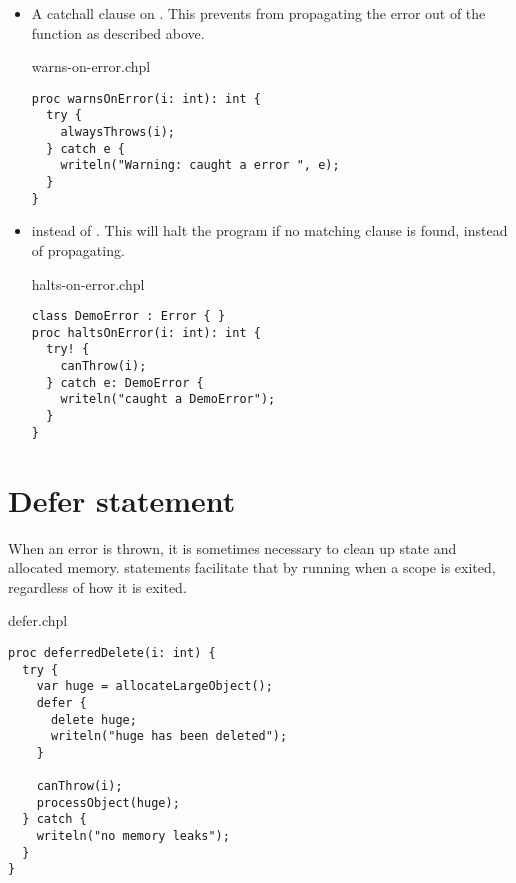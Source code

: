 \begin{itemize}

\item A catchall clause on . This prevents  from
propagating the error out of the function as described above.

\begin{chapelexample}{warns-on-error.chpl}
\begin{chapel}
\begin{verbatim}
proc warnsOnError(i: int): int {
  try {
    alwaysThrows(i);
  } catch e {
    writeln("Warning: caught a error ", e);
  }
}
\end{verbatim}
\end{chapel}
\end{chapelexample}

\item
{} instead of . This will halt the program if no matching
 clause is found, instead of propagating.

\begin{chapelexample}{halts-on-error.chpl}
\begin{chapel}
\begin{verbatim}
class DemoError : Error { }
proc haltsOnError(i: int): int {
  try! {
    canThrow(i);
  } catch e: DemoError {
    writeln("caught a DemoError");
  }
}
\end{verbatim}
\end{chapel}
\end{chapelexample}

\end{itemize}


\section{Defer statement}
\label{Errors_defer}

When an error is thrown, it is sometimes necessary to clean up state and
allocated memory.  statements facilitate that by running when a
scope is exited, regardless of how it is exited.

\begin{chapelexample}{defer.chpl}
\begin{chapel}
\begin{verbatim}
proc deferredDelete(i: int) {
  try {
    var huge = allocateLargeObject();
    defer {
      delete huge;
      writeln("huge has been deleted");
    }

    canThrow(i);
    processObject(huge);
  } catch {
    writeln("no memory leaks");
  }
}
\end{verbatim}
\end{chapel}
\end{chapelexample}

